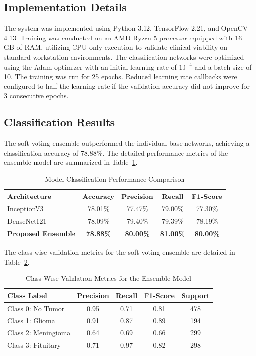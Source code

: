 \documentclass[journal,twoside]{IEEEtran}
\begin{document}
\subsection{Implementation Details}
The system was implemented using Python 3.12, TensorFlow 2.21, and OpenCV 4.13. Training was conducted on an AMD Ryzen 5 processor equipped with 16 GB of RAM, utilizing CPU-only execution to validate clinical viability on standard workstation environments. The classification networks were optimized using the Adam optimizer with an initial learning rate of $10^{-4}$ and a batch size of 10. The training was run for 25 epochs. Reduced learning rate callbacks were configured to half the learning rate if the validation accuracy did not improve for 3 consecutive epochs.

\subsection{Classification Results}
The soft-voting ensemble outperformed the individual base networks, achieving a classification accuracy of $78.88\%$. The detailed performance metrics of the ensemble model are summarized in Table~\ref{tab:classification_metrics}.

\begin{table}[h]
\centering
\caption{Model Classification Performance Comparison}
\label{tab:classification_metrics}
\begin{tabular}{lcccc}
\toprule
\textbf{Architecture} & \textbf{Accuracy} & \textbf{Precision} & \textbf{Recall} & \textbf{F1-Score} \\
\midrule
InceptionV3 & 78.01\% & 77.47\% & 79.00\% & 77.30\% \\
DenseNet121 & 78.09\% & 79.40\% & 79.39\% & 78.19\% \\
\textbf{Proposed Ensemble} & \textbf{78.88\%} & \textbf{80.00\%} & \textbf{81.00\%} & \textbf{80.00\%} \\
\bottomrule
\end{tabular}
\end{table}


The class-wise validation metrics for the soft-voting ensemble are detailed in Table~\ref{tab:classwise_metrics}.

\begin{table}[h]
\centering
\caption{Class-Wise Validation Metrics for the Ensemble Model}
\label{tab:classwise_metrics}
\begin{tabular}{lcccc}
\toprule
\textbf{Class Label} & \textbf{Precision} & \textbf{Recall} & \textbf{F1-Score} & \textbf{Support} \\
\midrule
Class 0: No Tumor & 0.95 & 0.71 & 0.81 & 478 \\
Class 1: Glioma & 0.91 & 0.87 & 0.89 & 194 \\
Class 2: Meningioma & 0.64 & 0.69 & 0.66 & 299 \\
Class 3: Pituitary & 0.71 & 0.97 & 0.82 & 298 \\
\bottomrule
\end{tabular}
\end{table}
\end{document}

